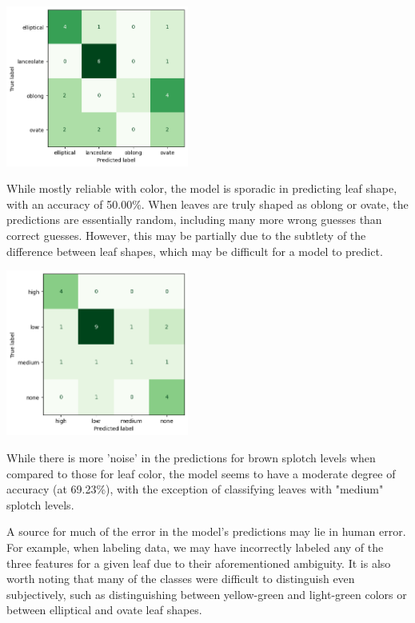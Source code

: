 \documentclass[final,5p,times,twocolumn,authoryear]{elsarticle}
\begin{document}
\begin{center}
    \includegraphics[width=0.45\textwidth]{images/morph_conf_matrix/shape.png}
\end{center}

While mostly reliable with color, the model is sporadic in predicting leaf shape, with an accuracy of 50.00\%. When leaves are truly shaped as oblong or ovate, the predictions are essentially random, including many more wrong guesses than correct guesses. However, this may be partially due to the subtlety of the difference between leaf shapes, which may be difficult for a model to predict.

\begin{center}
    \includegraphics[width=0.45\textwidth]{images/morph_conf_matrix/splotch.png}
\end{center}

While there is more 'noise' in the predictions for brown splotch levels when compared to those for leaf color, the model seems to have a moderate degree of accuracy (at 69.23\%), with the exception of classifying leaves with "medium" splotch levels. 

A source for much of the error in the model's predictions may lie in human error. For example, when labeling data, we may have incorrectly labeled any of the three features for a given leaf due to their aforementioned ambiguity. It is also worth noting that many of the classes were difficult to distinguish even subjectively, such as distinguishing between yellow-green and light-green colors or between elliptical and ovate leaf shapes. 
\end{document}

